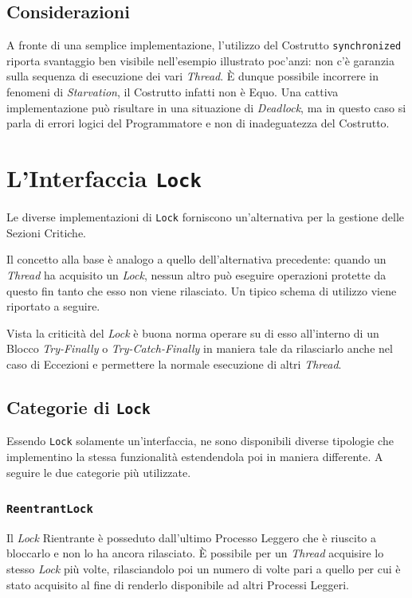 \subsection{Considerazioni}
A fronte di una semplice implementazione, l'utilizzo del Costrutto \texttt{synchronized} riporta svantaggio ben visibile nell'esempio illustrato poc'anzi: non c'è garanzia sulla sequenza di esecuzione dei vari \textit{Thread}. È dunque possibile incorrere in fenomeni di \textit{Starvation}, il Costrutto infatti non è Equo. Una cattiva implementazione può risultare in una situazione di \textit{Deadlock}, ma in questo caso si parla di errori logici del Programmatore e non di inadeguatezza del Costrutto.

\section{L'Interfaccia \texttt{Lock}}
Le diverse implementazioni di \texttt{Lock} forniscono un'alternativa per la gestione delle Sezioni Critiche\cite{Lock_JavaDocs}. \par
Il concetto alla base è analogo a quello dell'alternativa precedente: quando un \textit{Thread} ha acquisito un \textit{Lock}, nessun altro può eseguire operazioni protette da questo fin tanto che esso non viene rilasciato. Un tipico schema di utilizzo viene riportato a seguire. \par

Vista la criticità del \textit{Lock} è buona norma operare su di esso all'interno di un Blocco \textit{Try-Finally} o \textit{Try-Catch-Finally} in maniera tale da rilasciarlo anche nel caso di Eccezioni e permettere la normale esecuzione di altri \textit{Thread}. \par
\subsection{Categorie di \texttt{Lock}}
Essendo \texttt{Lock} solamente un'interfaccia, ne sono disponibili diverse tipologie che implementino la stessa funzionalità estendendola poi in maniera differente. A seguire le due categorie più utilizzate.
\subsubsection{\texttt{ReentrantLock}}
Il \textit{Lock} Rientrante è posseduto dall'ultimo Processo Leggero che è riuscito a bloccarlo e non lo ha ancora rilasciato. È possibile per un \textit{Thread} acquisire lo stesso \textit{Lock} più volte, rilasciandolo poi un numero di volte pari a quello per cui è stato acquisito al fine di renderlo disponibile ad altri Processi Leggeri\cite{ReentrantLock_JavaDocs}. 
